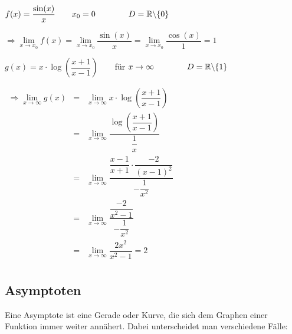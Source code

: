 \documentclass[main.tex]{subfiles}
\begin{document}
\begin{Beispiel}
	$f(x) = \dfrac{\sin(x)}{x} \qquad x_{0} = 0\qquad \qquad D=\mathbb{R}\backslash\{0\}$

	$\Rightarrow \lim\limits_{x \rightarrow x_{0}}f(x) = \lim\limits_{x \rightarrow x_{0}}\dfrac{\sin(x)}{x} = \lim\limits_{x \rightarrow x_{0}} \dfrac{\cos(x)}{1} = 1 $

	$g(x) = x\cdot \log \left( \dfrac{x+1}{x-1} \right) \qquad $für $ x\to \infty \qquad \qquad D=\mathbb{R}\backslash\{1\}$

	$\begin{array}{rcl}
		\Rightarrow \lim\limits_{x \to \infty} g(x) & = & \lim\limits_{x \to \infty} x\cdot \log \left( \dfrac{x+1}{x-1} \right) \\
		&=& \lim\limits_{x \to \infty} \dfrac{\log \left( \dfrac{x+1}{x-1} \right) }{\dfrac{1}{x}}\\
		&=& \lim\limits_{x \to \infty} \dfrac{\dfrac{x-1}{x+1} \cdot \dfrac{-2}{(x-1)^2}}{-\dfrac{1}{x^2}}\\
		&=& \lim\limits_{x \to \infty} \dfrac{\dfrac{-2}{x^2-1}}{-\dfrac{1}{x^2}}\\
		&=& \lim\limits_{x \to \infty} \dfrac{2x^2}{x^2-1} = 2 \\
	\end{array}$
\end{Beispiel}


\subsection{Asymptoten}

Eine Asymptote ist eine Gerade oder Kurve, die sich dem Graphen einer Funktion immer weiter annähert. Dabei unterscheidet man verschiedene Fälle:
\end{document}
